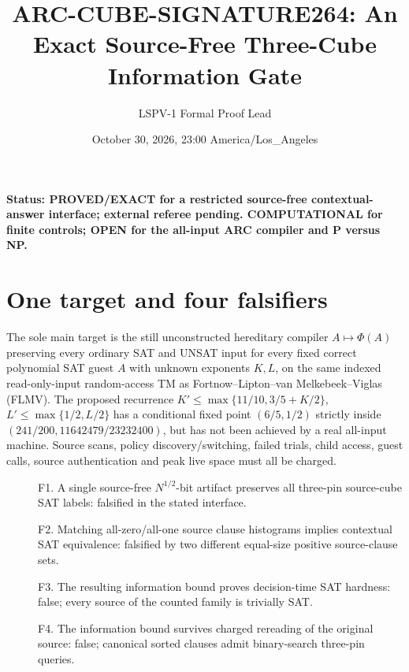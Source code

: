 \documentclass[11pt]{article}
\title{ARC-CUBE-SIGNATURE264: An Exact Source-Free Three-Cube Information Gate}
\author{LSPV-1 Formal Proof Lead}
\date{October 30, 2026, 23:00 America/Los\_Angeles}
\begin{document}
\maketitle
\noindent\textbf{Status: PROVED/EXACT for a restricted source-free contextual-answer interface; external referee pending. COMPUTATIONAL for finite controls; OPEN for the all-input ARC compiler and P versus NP.}
\section*{One target and four falsifiers}
The sole main target is the still unconstructed hereditary compiler
$A\mapsto\Phi(A)$ preserving every ordinary SAT and UNSAT input for
every fixed correct polynomial SAT guest $A$ with unknown exponents $K,L$,
on the same indexed read-only-input random-access TM as Fortnow--Lipton--van
Melkebeek--Viglas (FLMV). The proposed recurrence
$K'\leq\max\{11/10,3/5+K/2\}$, $L'\leq\max\{1/2,L/2\}$
has a conditional fixed point $(6/5,1/2)$ strictly inside
$(241/200,11642479/23232400)$, but has not been achieved by a real
all-input machine. Source scans, policy discovery/switching, failed
trials, child access, guest calls, source authentication and peak live
space must all be charged.
\begin{description}
\item[] F1. A single source-free $N^{1/2}$-bit artifact preserves all
three-pin source-cube SAT labels: falsified in the stated interface.
\item[] F2. Matching all-zero/all-one source clause histograms implies
contextual SAT equivalence: falsified by two different equal-size
positive source-clause sets.
\item[] F3. The resulting information bound proves decision-time SAT
hardness: false; every source of the counted family is trivially SAT.
\item[] F4. The information bound survives charged rereading of the
original source: false; canonical sorted clauses admit binary-search
three-pin queries.
\end{description}
\end{document}
